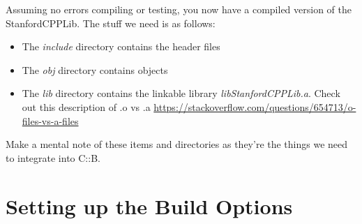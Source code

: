 \documentclass[10pt]{article}
\begin{document}
Assuming no errors compiling or testing, you now have a compiled version of the StanfordCPPLib. The stuff we need is as follows:
\begin{itemize}
\item The \textit{include} directory contains the header files
\item The \textit{obj} directory contains objects
\item The \textit{lib} directory contains the linkable library \textit{libStanfordCPPLib.a}. Check out this description of .o vs .a \url{https://stackoverflow.com/questions/654713/o-files-vs-a-files}
\end{itemize}
Make a mental note of these items and directories as they're the things we need to integrate into C::B. 

\section{ Setting up the Build Options }
\end{document}
